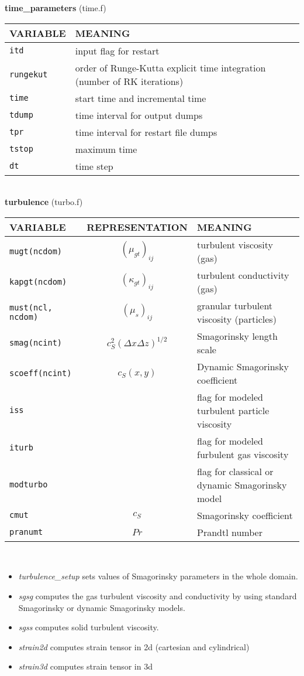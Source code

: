 %
{\large{\bf time\_parameters}} (time.f)\\[5mm]
\begin{tabular}{|p{6cm}|p{6cm}|}\hline
VARIABLE & MEANING\\\hline
\tt itd & input flag for restart \\\hline
\tt rungekut & order of Runge-Kutta explicit time integration (number of RK iterations) \\\hline
\tt time & start time and incremental time\\\hline
\tt tdump & time interval for output dumps \\\hline
\tt tpr & time interval for restart file dumps \\\hline
\tt tstop & maximum time \\\hline 
\tt dt & time step \\\hline
\end{tabular}\\[5mm]
%
%
{\large{\bf turbulence}} (turbo.f)\\[5mm]
\begin{tabular}{|p{6cm}|c|p{6cm}|}\hline
VARIABLE & REPRESENTATION & MEANING\\\hline
\tt mugt(ncdom) & $(\mu_{gt})_{ij}$ &  turbulent viscosity (gas)\\\hline
\tt kapgt(ncdom) & $(\kappa_{gt})_{ij}$ &  turbulent conductivity (gas)\\\hline
\tt must(ncl, ncdom) & $(\mu_s)_{ij}$ &   granular turbulent viscosity (particles)\\\hline
\tt smag(ncint) & $c_S^2(\Delta x\Delta z)^{1/2}$ &  Smagorinsky length scale \\\hline
\tt scoeff(ncint) & $c_S(x,y)$ &  Dynamic Smagorinsky coefficient \\\hline
\tt iss & $ $ & flag for modeled turbulent particle viscosity \\\hline
\tt iturb & $ $ & flag for modeled furbulent gas viscosity \\\hline
\tt modturbo & $ $ & flag for classical or dynamic Smagorinsky model\\\hline
\tt cmut & $ c_S $ &Smagorinsky coefficient \\\hline
\tt pranumt & $ Pr $ & Prandtl number\\\hline
\end{tabular}\\
\begin{itemize}
\item{\em turbulence\_setup} sets values of Smagorinsky parameters in the whole domain.
\item{\em sgsg} computes the gas turbulent viscosity and conductivity by using standard Smagorinsky
or dynamic Smagorinsky models.
\item{\em sgss} computes solid turbulent viscosity.
\item{\em strain2d} computes strain tensor in 2d (cartesian and cylindrical)
\item{\em strain3d} computes strain tensor in 3d
\end{itemize}
